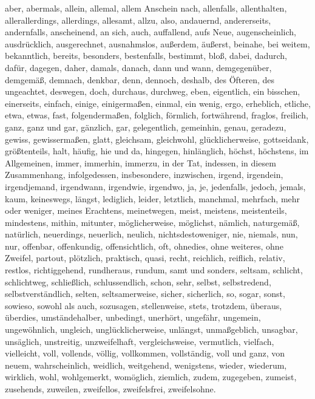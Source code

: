 \documentclass[a4paper,titlepage=true,twoside]{scrartcl}
\begin{document}
\begin{small}
aber, abermals, allein, allemal, allem Anschein nach, allenfalls, allenthalten,
allerallerdings, allerdings, allesamt, allzu, also, andauernd, andererseits,
andernfalls, anscheinend, an sich, auch, auffallend, aufs Neue, augenscheinlich,
ausdrücklich, ausgerechnet, ausnahmslos, außerdem, äußerst, beinahe, bei weitem,
bekanntlich, bereits, besonders, bestenfalls, bestimmt, bloß, dabei,
dadurch, dafür, dagegen, daher, damals, danach, dann und wann, demgegenüber,
demgemäß, demnach, denkbar, denn, dennoch, deshalb, des Öfteren, des ungeachtet,
deswegen, doch, durchaus, durchweg, eben, eigentlich, ein bisschen, einerseits,
einfach, einige, einigermaßen, einmal, ein wenig, ergo, erheblich, etliche,
etwa, etwas, fast, folgendermaßen, folglich, förmlich, fortwährend, fraglos,
freilich, ganz, ganz und gar, gänzlich, gar, gelegentlich, gemeinhin,
genau, geradezu, gewiss, gewissermaßen, glatt, gleichsam, gleichwohl,
glücklicherweise, gottseidank, größtenteils, halt, häufig, hie und da,
hingegen, hinlänglich, höchst, höchstens, im Allgemeinen, immer, immerhin,
immerzu, in der Tat, indessen, in diesem Zusammenhang, infolgedessen,
insbesondere, inzwischen, irgend, irgendein, irgendjemand, irgendwann,
irgendwie, irgendwo, ja, je, jedenfalls, jedoch, jemals, kaum, keineswegs,
längst, lediglich, leider, letztlich, manchmal, mehrfach, mehr oder weniger,
meines Erachtens, meinetwegen, meist, meistens, meistenteils,
mindestens, mithin, mitunter, möglicherweise, möglichst, nämlich, naturgemäß,
natürlich, neuerdings, neuerlich, neulich, nichtsdestoweniger, nie, niemals,
nun, nur, offenbar, offenkundig, offensichtlich, oft, ohnedies, ohne weiteres,
ohne Zweifel, partout, plötzlich, praktisch, quasi, recht, reichlich,
reiflich, relativ, restlos, richtiggehend, rundheraus, rundum, samt und sonders,
seltsam, schlicht, schlichtweg, schließlich, schlussendlich, schon, sehr,
selbst, selbstredend, selbstverständlich, selten, seltsamerweise, sicher,
sicherlich, so, sogar, sonst, sowieso, sowohl als auch, sozusagen, stellenweise,
stets, trotzdem, überaus, überdies, umständehalber, unbedingt, unerhört,
ungefähr, ungemein, ungewöhnlich, ungleich, unglücklicherweise, unlängst,
unmaßgeblich, unsagbar, unsäglich, unstreitig, unzweifelhaft, vergleichsweise,
vermutlich, vielfach, vielleicht, voll, vollends, völlig, vollkommen,
vollständig, voll und ganz, von neuem, wahrscheinlich, weidlich, weitgehend,
wenigstens, wieder, wiederum, wirklich, wohl, wohlgemerkt, womöglich,
ziemlich, zudem, zugegeben, zumeist, zusehends, zuweilen, zweifellos, zweifelsfrei,
zweifelsohne.
\end{small}
\end{document}
